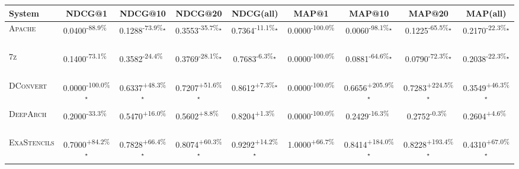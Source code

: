 \begin{table}[htbp]
\centering
\renewcommand{\arraystretch}{1.2}
\begin{tabular}{l|cccc|cccc}
\hline
System & NDCG@1 & NDCG@10 & NDCG@20 & NDCG(all) & MAP@1 & MAP@10 & MAP@20 & MAP(all) \\ \hline
\textsc{Apache} & \cellcolor{red!30}0.0400\textsuperscript{-88.9\%}$^{\,\,\,}$ & \cellcolor{red!30}0.1288\textsuperscript{-73.9\%}$^\star$ & \cellcolor{red!30}0.3553\textsuperscript{-35.7\%}$^\star$ & \cellcolor{red!30}0.7364\textsuperscript{-11.1\%}$^\star$ & \cellcolor{red!30}0.0000\textsuperscript{-100.0\%}$^{\,\,\,}$ & \cellcolor{red!30}0.0060\textsuperscript{-98.1\%}$^\star$ & \cellcolor{red!30}0.1225\textsuperscript{-65.5\%}$^\star$ & \cellcolor{red!30}0.2170\textsuperscript{-22.3\%}$^\star$ \\
\textsc{7z} & \cellcolor{red!30}0.1400\textsuperscript{-73.1\%}$^{\,\,\,}$ & \cellcolor{red!30}0.3582\textsuperscript{-24.4\%}$^{\,\,\,}$ & \cellcolor{red!30}0.3769\textsuperscript{-28.1\%}$^\star$ & \cellcolor{red!30}0.7683\textsuperscript{-6.3\%}$^\star$ & \cellcolor{red!30}0.0000\textsuperscript{-100.0\%}$^{\,\,\,}$ & \cellcolor{red!30}0.0881\textsuperscript{-64.6\%}$^\star$ & \cellcolor{red!30}0.0790\textsuperscript{-72.3\%}$^\star$ & \cellcolor{red!30}0.2038\textsuperscript{-22.3\%}$^\star$ \\
\textsc{DConvert} & \cellcolor{red!30}0.0000\textsuperscript{-100.0\%}$^\star$ & \cellcolor{green!30}0.6337\textsuperscript{+48.3\%}$^\star$ & \cellcolor{green!30}0.7207\textsuperscript{+51.6\%}$^\star$ & \cellcolor{green!30}0.8612\textsuperscript{+7.3\%}$^\star$ & \cellcolor{red!30}0.0000\textsuperscript{-100.0\%}$^{\,\,\,}$ & \cellcolor{green!30}0.6656\textsuperscript{+205.9\%}$^\star$ & \cellcolor{green!30}0.7283\textsuperscript{+224.5\%}$^\star$ & \cellcolor{green!30}0.3549\textsuperscript{+46.3\%}$^\star$ \\
\textsc{DeepArch} & \cellcolor{red!30}0.2000\textsuperscript{-33.3\%}$^{\,\,\,}$ & \cellcolor{green!30}0.5470\textsuperscript{+16.0\%}$^{\,\,\,}$ & \cellcolor{green!30}0.5602\textsuperscript{+8.8\%}$^{\,\,\,}$ & \cellcolor{green!30}0.8204\textsuperscript{+1.3\%}$^{\,\,\,}$ & \cellcolor{red!30}0.0000\textsuperscript{-100.0\%}$^{\,\,\,}$ & \cellcolor{red!30}0.2429\textsuperscript{-16.3\%}$^{\,\,\,}$ & \cellcolor{red!30}0.2752\textsuperscript{-0.3\%}$^{\,\,\,}$ & \cellcolor{green!30}0.2604\textsuperscript{+4.6\%}$^{\,\,\,}$ \\
\textsc{ExaStencils} & \cellcolor{green!30}0.7000\textsuperscript{+84.2\%}$^\star$ & \cellcolor{green!30}0.7828\textsuperscript{+66.4\%}$^\star$ & \cellcolor{green!30}0.8074\textsuperscript{+60.3\%}$^\star$ & \cellcolor{green!30}0.9292\textsuperscript{+14.2\%}$^\star$ & \cellcolor{green!30}1.0000\textsuperscript{+66.7\%}$^{\,\,\,}$ & \cellcolor{green!30}0.8414\textsuperscript{+184.0\%}$^\star$ & \cellcolor{green!30}0.8228\textsuperscript{+193.4\%}$^\star$ & \cellcolor{green!30}0.4310\textsuperscript{+67.0\%}$^\star$ \\

\end{tabular}
\end{table}
